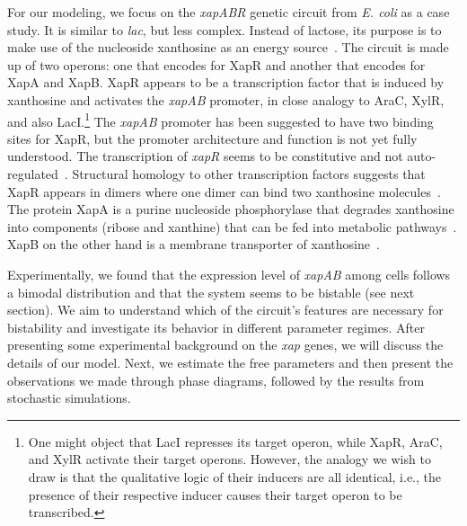 \documentclass[10pt,letterpaper]{article}
\begin{document}
	For our modeling, we focus on the \emph{xapABR} genetic circuit from
	\emph{E. coli} as a case study. It is similar to \emph{lac}, but less
	complex. Instead of lactose, its purpose is to make use of the nucleoside
	xanthosine as an energy source~\cite{Buxton1980,Hammer-Jespersen1980}. The
	circuit is made up of two operons: one that encodes for XapR and another
	that encodes for XapA and XapB. XapR appears to be a transcription factor
	that is induced by xanthosine and activates the \emph{xapAB} promoter,
	in close analogy to AraC, XylR, and also LacI.\footnote{One might object that LacI represses its target operon, while
	XapR, AraC, and XylR activate their target operons. However, the analogy
	we wish to draw is that the qualitative logic of their inducers are all
	identical, i.e., the presence of their respective inducer causes their
	target operon to be transcribed.} The \textit{xapAB} promoter has been suggested to have two binding sites for XapR\cite{Seeger1995},
	but the promoter architecture and function is not yet fully understood. The
	transcription of \emph{xapR} seems to be constitutive and not
	auto-regulated~\cite{Seeger1995}. Structural homology to other transcription
	factors suggests that XapR appears in dimers where one dimer can bind two
	xanthosine molecules~\cite{Joergensen1999}. The protein XapA is a purine
	nucleoside phosphorylase that degrades xanthosine into components (ribose
	and xanthine) that can be fed into metabolic
	pathways~\cite{Buxton1980,Hammer-Jespersen1980}. XapB on the other hand is a
	membrane transporter of xanthosine~\cite{Seeger1995,Norholm2001}.
	
	Experimentally, we found that the expression level of \emph{xapAB} among
	cells follows a bimodal distribution and that the system seems to be
	bistable (see next section). We aim to understand which of the circuit's
	features are necessary for bistability and investigate its behavior in
	different parameter regimes. After presenting some experimental background on the \emph{xap} genes, we will discuss the
	details of our model. Next, we estimate the free parameters and then present
	the observations we made through phase diagrams, followed by the results
	from stochastic simulations.
	
\end{document}
